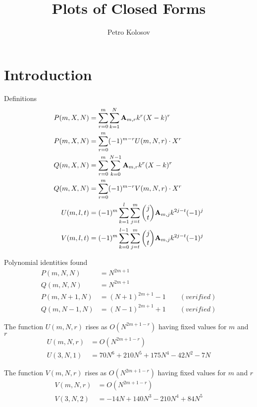 \documentclass[12pt,letterpaper,oneside,reqno]{amsart}
\title[Plots of Closed Forms]
{Plots of Closed Forms}
\author[Petro Kolosov]{Petro Kolosov}
\newcommand \coeffA [3][A] {{\mathbf{#1}} \sb{#2,#3}}
\newcommand \polynomialP [4][P]{{#1}(#2,#3,#4)}
\newcommand \polynomialQ [4][Q]{{#1}(#2,#3,#4)}
\begin{document}
    \begin{abstract}
        
    \end{abstract}

    \maketitle

    \tableofcontents


    \section{Introduction}\label{sec:introduction}
    Definitions
    \begin{align*}
        \polynomialP{m}{X}{N} &= \sum_{r=0}^{m} \sum_{k=1}^{N} \coeffA{m}{r} k^r (X-k)^r \\
        \polynomialP{m}{X}{N} &= \sum_{r=0}^{m} (-1)^{m-r} U(m, N, r) \cdot X^{r} \\
        \polynomialQ{m}{X}{N} &= \sum_{r=0}^{m} \sum_{k=0}^{N-1} \coeffA{m}{r} k^r (X-k)^r \\
        \polynomialQ{m}{X}{N} &= \sum_{r=0}^{m} (-1)^{m-r} V(m, N, r) \cdot X^{r} \\
        U(m, l, t) &= (-1)^m \sum_{k=1}^{l} \sum_{j=t}^{m} \binom{j}{t} \coeffA{m}{j} k^{2j-t} (-1)^j \\
        V(m, l, t) &= (-1)^m \sum_{k=0}^{l-1}  \sum_{j=t}^{m} \binom{j}{t} \coeffA{m}{j} k^{2j-t} (-1)^j
    \end{align*}

    Polynomial identities found
    \begin{align*}
        \polynomialP{m}{N}{N} &= N^{2m+1} \\
        \polynomialQ{m}{N}{N} &= N^{2m+1} \\
        \polynomialP{m}{N+1}{N} &= (N+1)^{2m+1} - 1 \quad \quad (verified) \\
        \polynomialQ{m}{N-1}{N} &= (N-1)^{2m+1} + 1 \quad \quad (verified)
    \end{align*}

    The function $U(m, N, r)$ rises as $O(N^{2m+1-r})$ having fixed values for $m$ and $r$
    \begin{align*}
        U(m, N, r) &= O(N^{2m+1-r}) \\
        U(3, N, 1) &= 70 N^6+210 N^5+175 N^4-42 N^2-7 N
    \end{align*}

    The function $V(m, N, r)$ rises as $O(N^{2m+1-r})$ having fixed values for $m$ and $r$
    \begin{align*}
        V(m, N, r) &= O(N^{2m+1-r}) \\
        V(3, N, 2) &= -14 N + 140 N^3 - 210 N^4 + 84 N^5
    \end{align*}
\end{document}
